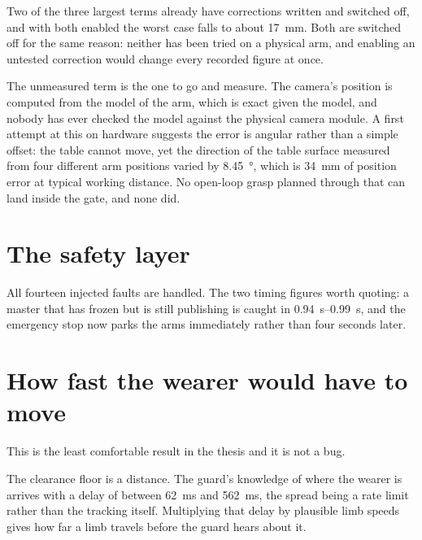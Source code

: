 Two of the three largest terms already have corrections written and switched
off, and with both enabled the worst case falls to about
\SI{17}{\milli\metre}. Both are switched off for the same reason: neither has
been tried on a physical arm, and enabling an untested correction would change
every recorded figure at once.

The unmeasured term is the one to go and measure. The camera's position is
computed from the model of the arm, which is exact given the model, and nobody
has ever checked the model against the physical camera module. A first attempt
at this on hardware suggests the error is angular rather than a simple offset:
the table cannot move, yet the direction of the table surface measured from
four different arm positions varied by \SI{8.45}{\degree}, which is
\SI{34}{\milli\metre} of position error at typical working distance. No
open-loop grasp planned through that can land inside the gate, and none did.

\section{The safety layer}

All fourteen injected faults are handled. The two timing figures worth
quoting: a master that has frozen but is still publishing is caught in
\SIrange{0.94}{0.99}{\second}, and the emergency stop now parks the arms
immediately rather than four seconds later.

\section{How fast the wearer would have to move}

This is the least comfortable result in the thesis and it is not a bug.

The clearance floor is a distance. The guard's knowledge of where the wearer
is arrives with a delay of between \SI{62}{\milli\second} and
\SI{562}{\milli\second}, the spread being a rate limit rather than the
tracking itself. Multiplying that delay by plausible limb speeds gives how far
a limb travels before the guard hears about it.

